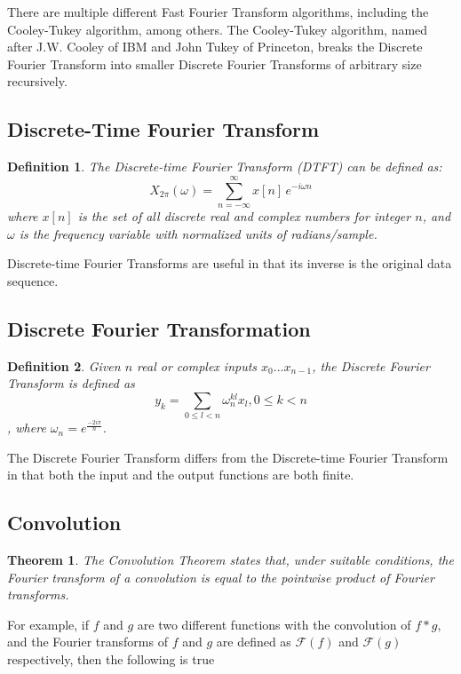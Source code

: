 \documentclass{article}
\newtheorem{theorem}{Theorem}
\newtheorem{definition}{Definition}
\begin{document}
There are multiple different Fast Fourier Transform algorithms, including the Cooley-Tukey algorithm, among others. The Cooley-Tukey algorithm, named after J.W. Cooley of IBM and John Tukey of Princeton, breaks the Discrete Fourier Transform into smaller Discrete Fourier Transforms of arbitrary size recursively.\cite{CarnegieFFT}
\subsection{Discrete-Time Fourier Transform}
\begin{definition}
	The {\em Discrete-time Fourier Transform (DTFT)} can be defined as:
	$$X_{2\pi}(\omega) = \sum_{n=-\infty}^{\infty} x[n] \,e^{-i \omega n}$$
	where $x[n]$ is the set of all discrete real and complex numbers for integer $n$, and $\omega$ is the frequency variable with normalized units of radians/sample.\cite{UBC}
\end{definition}

Discrete-time Fourier Transforms are useful in that its inverse is the original data sequence.
\subsection{Discrete Fourier Transformation}
\begin{definition}
	Given $n$ real or complex inputs $x_{0}...x_{n-1}$, the Discrete Fourier Transform is defined as $$y_{k} = \sum_{0\leq l < n} \omega_n^{kl}x_l, 0 \leq k < n $$, 
	where $\omega_n = e^{\frac{-2i\pi}{n}}$.\cite{CarnegieFFT}
\end{definition}
The Discrete Fourier Transform differs from the Discrete-time Fourier Transform in that both the input and the output functions are both finite.


\subsection{Convolution}
\begin{theorem}
	The Convolution Theorem states that, under suitable conditions, the Fourier transform of a convolution is equal to the pointwise product of Fourier transforms.\cite{BerkConvolution}\cite{Convolution}
\end{theorem}

For example, if $f$ and $g$ are two different functions with the convolution of $f*g$, and the Fourier transforms of $f$ and $g$ are defined as $\mathcal{F}(f)$ and $\mathcal{F}(g)$ respectively, then the following is true
\end{document}
